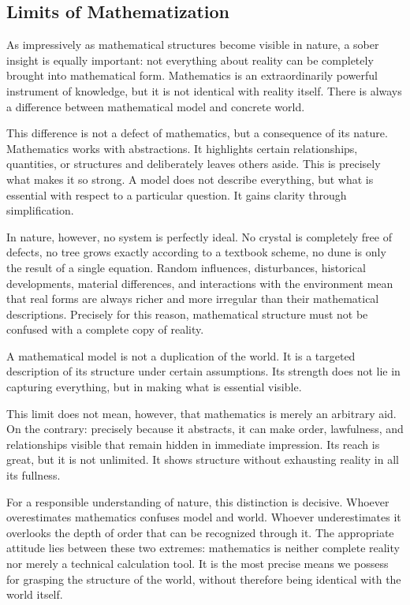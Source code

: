 \subsection{Limits of Mathematization}

As impressively as mathematical structures become visible in nature,
a sober insight is equally important:
not everything about reality can be completely brought into mathematical form.
Mathematics is an extraordinarily powerful instrument of knowledge,
but it is not identical with reality itself.
There is always a difference between mathematical model and concrete world.

This difference is not a defect of mathematics,
but a consequence of its nature.
Mathematics works with abstractions.
It highlights certain relationships,
quantities,
or structures
and deliberately leaves others aside.
This is precisely what makes it so strong.
A model does not describe everything,
but what is essential with respect to a particular question.
It gains clarity through simplification.

In nature, however, no system is perfectly ideal.
No crystal is completely free of defects,
no tree grows exactly according to a textbook scheme,
no dune is only the result of a single equation.
Random influences,
disturbances,
historical developments,
material differences,
and interactions with the environment
mean that real forms are always richer and more irregular
than their mathematical descriptions.
Precisely for this reason, mathematical structure must not be confused
with a complete copy of reality.

\begin{DidacticBox}
	\label{box:model-reality}
	A mathematical model is not a duplication of the world.
	It is a targeted description of its structure under certain assumptions.
	Its strength does not lie in capturing everything,
	but in making what is essential visible.
\end{DidacticBox}

This limit does not mean, however,
that mathematics is merely an arbitrary aid.
On the contrary:
precisely because it abstracts,
it can make order,
lawfulness,
and relationships visible
that remain hidden in immediate impression.
Its reach is great,
but it is not unlimited.
It shows structure
without exhausting reality in all its fullness.

For a responsible understanding of nature,
this distinction is decisive.
Whoever overestimates mathematics
confuses model and world.
Whoever underestimates it
overlooks the depth of order
that can be recognized through it.
The appropriate attitude lies between these two extremes:
mathematics is neither complete reality
nor merely a technical calculation tool.
It is the most precise means we possess
for grasping the structure of the world,
without therefore being identical with the world itself.

